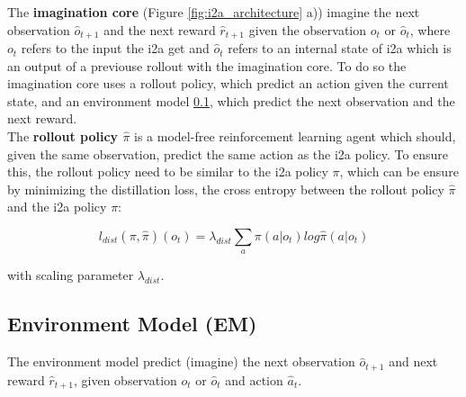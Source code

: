 The \textbf{imagination core} (Figure \ref{fig:i2a_architecture} a)) imagine the next observation $\hat{o}_{t+1}$ and the next reward $\hat{r}_{t+1}$ given the observation $o_t$ or $\hat{o}_{t}$, where $o_t$ refers to the  input the i2a get and $\hat{o}_{t}$ refers to an internal state of i2a which is an output of a previouse rollout with the imagination core.
To do so the imagination core uses a rollout policy, which predict an action given the current state, and an environment model \ref{sec:env_model}, which predict the next observation and the next reward.\\




The \textbf{rollout policy $\hat{\pi}$} is a model-free reinforcement learning agent which should, given the same observation, predict the same action as the i2a policy. To ensure this, the rollout policy need to be similar to the i2a policy $\pi$, which can be ensure by minimizing the distillation loss, the cross entropy between the rollout policy $\hat{\pi}$ and the i2a policy $\pi$:

 
\begin{equation} 
    l_{dist}(\pi, \hat{\pi})(o_t) = \lambda_{dist} \sum_a \pi(a | o_t) log \hat{\pi}(a|o_t) 
\end{equation} 

with scaling parameter $\lambda_{dist}$.\\



\subsection{Environment Model (EM)}
\label{sec:env_model}

The environment model predict (imagine) the next observation $\hat{o}_{t+1}$ and next reward $\hat{r}_{t+1}$, given observation $o_t$ or $\hat{o}_t$ and action $\hat{a}_t$.\\

